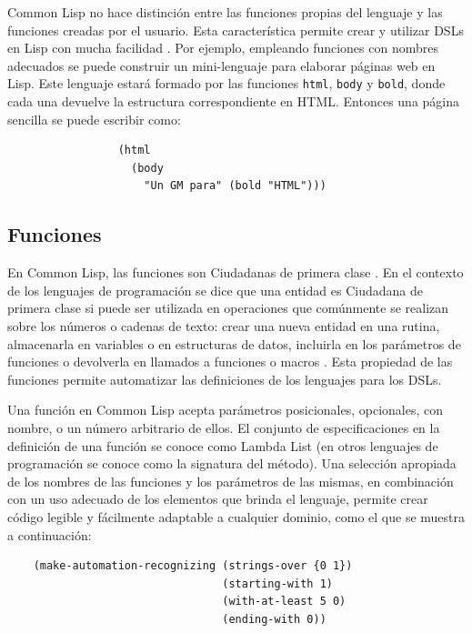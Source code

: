 
Common Lisp no hace distinción entre las funciones propias del lenguaje y las funciones creadas por el usuario\cite{onlisp}. Esta característica permite crear y utilizar DSLs en Lisp con mucha facilidad \cite{Land-of-Lisp}. Por ejemplo, empleando funciones con nombres adecuados se puede construir un mini-lenguaje para elaborar páginas web en Lisp. Este lenguaje estará formado por las funciones \texttt{html}, \texttt{body} y \texttt{bold}, donde cada una devuelve la estructura correspondiente en HTML. Entonces una página sencilla se puede escribir como:
\begin{verbatim}
                 (html 
                   (body
                     "Un GM para" (bold "HTML")))
\end{verbatim}

\subsection{Funciones}

En Common Lisp, las funciones son Ciudadanas de primera clase \cite{onlisp}. En el contexto de los lenguajes de programación se dice que una entidad es Ciudadana de primera clase si puede ser utilizada en operaciones que comúnmente se realizan sobre los números o cadenas de texto: crear una nueva entidad en una rutina, almacenarla en variables o en estructuras de datos, incluirla en los parámetros de funciones o devolverla en llamados a funciones o macros \cite{onlisp}. Esta propiedad de las funciones permite automatizar las definiciones de los lenguajes para los DSLs.
  
Una función en Common Lisp acepta parámetros posicionales, opcionales, con nombre, o un número arbitrario de ellos. El conjunto de especificaciones en la definición de una función se conoce como Lambda List \cite{practical-common-lisp} (en otros lenguajes de programación se conoce como la signatura del método). Una selección apropiada de los nombres de las funciones y los parámetros de las mismas, en combinación con un uso adecuado de los elementos que brinda el lenguaje, permite crear código legible y fácilmente adaptable a cualquier dominio, como el que se muestra a continuación:
\begin{verbatim}
    (make-automation-recognizing (strings-over {0 1})
                                 (starting-with 1)
                                 (with-at-least 5 0)
                                 (ending-with 0))
\end{verbatim}

